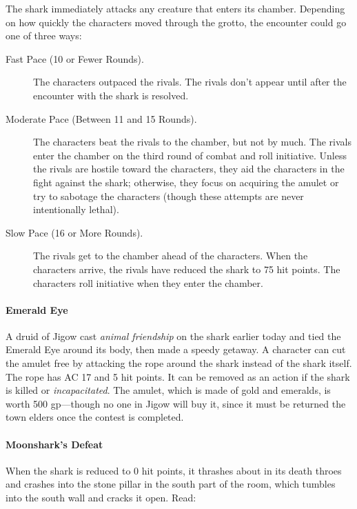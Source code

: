 \documentclass[a4paper, 11pt, bg=full, twocolumn, nooutline]{dndbook}
\begin{document}
The shark immediately attacks any creature that enters its chamber. Depending on how quickly the characters moved through the grotto, the encounter could go one of three ways:

\begin{description}
\item[Fast Pace (10 or Fewer Rounds).] The characters outpaced the rivals. The rivals don't appear until after the encounter with the shark is resolved.
\item[Moderate Pace (Between 11 and 15 Rounds).] The characters beat the rivals to the chamber, but not by much. The rivals enter the chamber on the third round of combat and roll initiative. Unless the rivals are hostile toward the characters, they aid the characters in the fight against the shark; otherwise, they focus on acquiring the amulet or try to sabotage the characters (though these attempts are never intentionally lethal).
\item[Slow Pace (16 or More Rounds).] The rivals get to the chamber ahead of the characters. When the characters arrive, the rivals have reduced the shark to 75 hit points. The characters roll initiative when they enter the chamber.
\end{description}

\paragraph{Emerald Eye}

A druid of Jigow cast \textit{animal friendship} on the shark earlier today and tied the Emerald Eye around its body, then made a speedy getaway. A character can cut the amulet free by attacking the rope around the shark instead of the shark itself. The rope has AC 17 and 5 hit points. It can be removed as an action if the shark is killed or \textit{incapacitated}. The amulet, which is made of gold and emeralds, is worth 500 gp---though no one in Jigow will buy it, since it must be returned the town elders once the contest is completed.

\paragraph{Moonshark's Defeat}

When the shark is reduced to 0 hit points, it thrashes about in its death throes and crashes into the stone pillar in the south part of the room, which tumbles into the south wall and cracks it open. Read:
\end{document}
